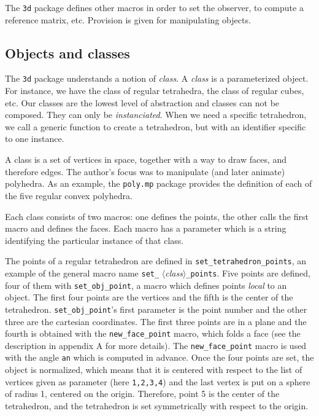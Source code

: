 \documentclass[nonumber,harvardcite]{ltugboat}
\DeclareRobustCommand\meta[1]{%
       \ensuremath{\langle}\emph{#1}\ensuremath{\rangle}}
\begin{document}
The \verb|3d| package defines other macros in order to set the observer,
to compute a reference matrix, etc. Provision is given for
manipulating objects.


\subsection{Objects and classes}

The \texttt{3d} package understands a notion of \emph{class}. 
A \emph{class} is a parameterized object. For instance, we have the class
of regular tetrahedra, the class of regular cubes, etc. Our classes
are the lowest level of abstraction and classes can not be composed.
They can only be \emph{instanciated}. When we need a specific tetrahedron,
we call a generic function to create a tetrahedron, but with an identifier
specific to one instance.

A class is a set of vertices in space, together with a way to draw
faces, and therefore edges. 
The author's focus was to manipulate (and later animate) polyhedra. 
As an example, the \verb|poly.mp| package provides the definition of
each of the five regular convex polyhedra. 

Each class consists of two macros: one defines the points,
the other calls the first macro and defines the faces.
Each macro has a parameter which is a string identifying
the particular instance of that class.

The points of a regular tetrahedron are defined in 
\verb|set_tetrahedron_points|, 
an example of the general macro name \verb|set_|\meta{class}\verb|_points|.
Five points are defined, four of
them with \verb|set_obj_point|, a macro which defines points \emph{local}
to an object. The first four points are the vertices and the fifth
is the center of the tetrahedron. \verb|set_obj_point|'s first parameter
is the point number and the other three are the cartesian coordinates.
The first three points are in a plane and the fourth is obtained with
the \verb|new_face_point| macro, which folds a face
(see the description in appendix A for more details).
The \verb|new_face_point| macro
is used with the angle \verb|an| which is computed in advance.
Once the four points are set, the object is normalized, which means
that it is centered with respect to the list of vertices given
as parameter (here \verb|1,2,3,4|) and the last vertex is put on a sphere
of radius 1, centered on the origin. Therefore, point 5 is the center
of the tetrahedron, and the tetrahedron is set symmetrically
with respect to the origin.
\end{document}
